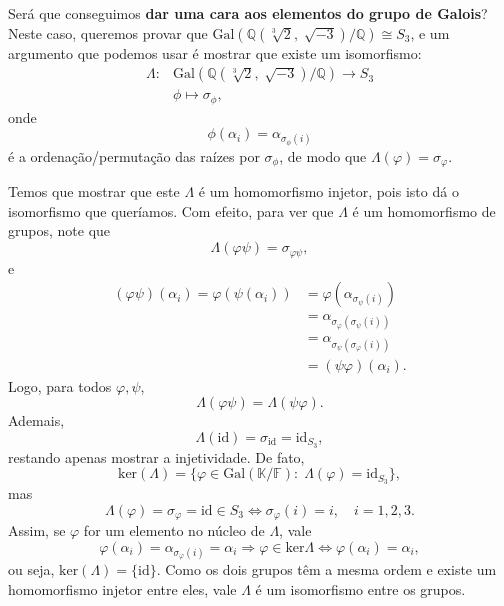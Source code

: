 \documentclass[../algebraIII_notes.tex]{subfiles}
\begin{document}
\begin{example}
	Será que conseguimos \textbf{dar uma cara aos elementos do grupo de Galois}? Neste caso, queremos provar que \(\mathrm{Gal}(\mathbb{Q}(\sqrt[3]{2}, \sqrt[]{-3})/\mathbb{Q})\cong S_{3}\), e um argumento que podemos usar é mostrar que existe um isomorfismo:
	\begin{align*}
		\Lambda : & \mathrm{Gal}(\mathbb{Q}(\sqrt[3]{2}, \sqrt[]{-3})/\mathbb{Q})\rightarrow S_{3} \\
		          & \phi \longmapsto  \sigma_{\phi },
	\end{align*}
	onde
	\[
		\phi (\alpha_{i}) = \alpha_{\sigma_{\phi }(i)}
	\]
	é a ordenação/permutação das raízes por \(\sigma_{\phi }\), de modo que \(\Lambda(\varphi ) = \sigma_{\varphi }\).

	Temos que mostrar que este \(\Lambda \) é um homomorfismo injetor, pois isto dá o isomorfismo que queríamos. Com efeito, para ver que \(\Lambda \) é um homomorfismo de grupos, note que
	\[
		\Lambda (\varphi \psi ) = \sigma_{\varphi \psi },
	\]
	e
	\begin{align*}
		(\varphi \psi )(\alpha_{i}) = \varphi (\psi (\alpha_{i})) & = \varphi(\alpha_{\sigma_{\psi }(i)})           \\
		                                                          & = \alpha_{\sigma_{\varphi }(\sigma_{\psi }(i))} \\
		                                                          & = \alpha_{\sigma_{\psi }(\sigma_{\varphi }(i))} \\
		                                                          & =(\psi \varphi )(\alpha_{i}).
	\end{align*}
	Logo, para todos \(\varphi , \psi\),
	\[
		\Lambda (\varphi \psi ) = \Lambda (\psi \varphi ).
	\]
	Ademais,
	\[
		\Lambda (\mathrm{id}) = \sigma_{\mathrm{id}} = \mathrm{id}_{S_{3}},
	\]
	restando apenas mostrar a injetividade. De fato,
	\[
		\mathrm{ker}(\Lambda ) = \{\varphi \in \mathrm{Gal}(\mathbb{K}/\mathbb{F}):\; \Lambda (\varphi ) = \mathrm{id}_{S_{3}}\},
	\]
	mas
	\[
		\Lambda (\varphi ) = \sigma_{\varphi } = \mathrm{id}\in S_{3}\Longleftrightarrow \sigma_{\varphi }(i) = i, \quad i=1, 2, 3.
	\]
	Assim, se \(\varphi \) for um elemento no núcleo de \(\Lambda \), vale
	\[
		\varphi (\alpha_{i})=\alpha_{\sigma_{\varphi }(i)} = \alpha_{i} \Rightarrow \varphi\in \mathrm{ker}\Lambda \Longleftrightarrow \varphi(\alpha_{i})=\alpha_{i},
	\]
	ou seja, \(\mathrm{ker}(\Lambda ) = \{\mathrm{id}\}\). Como os dois grupos têm a mesma ordem e existe um homomorfismo injetor entre eles, vale \(\Lambda \) é um isomorfismo entre os grupos.


\end{example}
\end{document}
